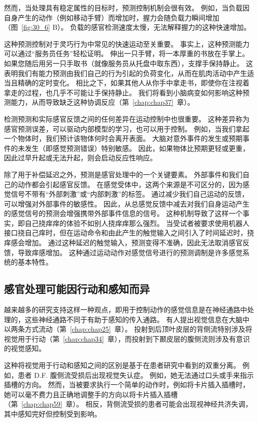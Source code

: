 然而，当处理具有稳定属性的目标时，预测控制机制会很有效。
例如，当负载因自身产生的动作（例如移动手臂）而增加时，握力会随负载力瞬间增加（图~\ref{fig:30_6} B）。
负载的感官检测速度太慢，无法解释握力的这种快速增加。


这种预测控制对于灵巧行为中常见的快速运动至关重要。 事实上，这种预测能力可以通过“服务员任务”轻松证明。 
伸出一只手臂，将一本厚重的书放在手掌上。
如果您随后用另一只手取书（就像服务员从托盘中取东西），支撑手保持静止。
这表明我们有能力预测由我们自己的行为引起的负荷变化，从而在肌肉活动中产生适当且精确的定时变化。
相比之下，如果其他人从你手中拿走书，即使你在注视着拿走的过程，也几乎不可能让手保持静止。
我们将看到小脑病变如何影响这种预测能力，从而导致缺乏这种协调反应（第~\ref{chap:chap37}~章）。


检测预测和实际感官反馈之间的任何差异在运动控制中也很重要。
这种差异称为感官预测误差，可以驱动内部模型的学习，也可以用于控制。
例如，当我们拿起一个物体时，我们预计该物体何时会离开表面。
大脑对意外事件的发生或预期事件的未发生（即感觉预测错误）特别敏感。
因此，如果物体比预期更轻或更重，因此过早升起或无法升起，则会启动反应性响应。


除了用于补偿延迟之外，预测是感官处理中的一个关键要素。
外部事件和我们自己的动作都会引起感官反馈。
在感觉受体中，这两个来源是不可区分的，因为感觉信号不带有“外部刺激”或“内部刺激”的标签。
通过减少我们自己运动的反馈，可以增强对外部事件的敏感性。
因此，从总感觉反馈中减去对我们自身运动产生的感觉信号的预测会增强携带外部事件信息的信号。
这种机制导致了这样一个事实，即自己挠痒痒的体验不如别人挠痒痒那么强烈。
当受试者被要求使用机器人接口挠自己痒时，但在运动命令和由此产生的触觉输入之间引入了时间延迟时，挠痒感会增加。
通过这种延迟的触觉输入，预测变得不准确，因此无法取消感官反馈，导致痒感增加。
这种通过运动动作对感觉信号进行的预测调制是许多感觉系统的基本特性。



\subsection{感官处理可能因行动和感知而异}

越来越多的研究支持这样一种观点，即用于控制动作的感觉信息是在神经通路中处理的，这些神经通路不同于有助于感知的传入通路。
有人提出视觉信息在大脑中以两条方式流动（第~\ref{chap:chap25}~章）。
投射到后顶叶皮层的背侧流特别涉及将视觉用于行动（第~\ref{chap:chap34}~章），而投射到下颞皮层的腹侧流则涉及有意识的视觉感知。


这种将视觉用于行动和感知之间的区别是基于在患者研究中看到的双重分离。
例如，患者 D.F. 腹侧流受损后出现视觉失认症。
例如，她无法通过口头或手来指示插槽的方向。
然而，当被要求执行一个简单的动作时，例如将卡片插入插槽时，她可以毫不费力且正确地调整手的方向以将卡片插入插槽（第~\ref{chap:chap59}~章）。
相反，背侧流受损的患者可能会出现视神经共济失调，其中感知完好但控制受到影响。


